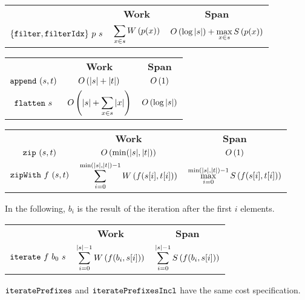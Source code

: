 \begin{costspec}[Filter]

\begin{tabular}{c|c|c}
& \textbf{Work} & \textbf{Span} \\
%
$\{\texttt{filter},\texttt{filterIdx}\}~p~s$ &
$\displaystyle \sum_{x \in s} W\left({p(x)}\right)$ &
$\displaystyle O\left({\log{|s|}}\right) + \max_{x \in s} S\left({p(x)}\right)$ \\
%
\end{tabular}
\end{costspec}

\begin{costspec}[Concatenation]

\begin{tabular}{c|c|c}
& \textbf{Work} & \textbf{Span} \\
%
$\texttt{append}~(s,t)$ &
$\displaystyle O\left({|s| + |t|}\right)$ &
$\displaystyle O\left({1}\right)$ \\
%
$\texttt{flatten}~s$ &
$\displaystyle O\left({|s| + \sum_{x \in s} |x|}\right)$ &
$\displaystyle O\left({\log{|s|}}\right)$
%
\end{tabular}
\end{costspec}

\begin{costspec}[Zip]

\begin{tabular}{c|c|c}
& \textbf{Work} & \textbf{Span} \\
%
$\texttt{zip}~(s,t)$ &
$\displaystyle O\left({\min(|s|,|t|)}\right)$ &
$\displaystyle O\left({1}\right)$ \\
%
$\texttt{zipWith}~f~(s,t)$ &
$\displaystyle \sum_{i = 0}^{\min(|s|,|t|)-1} W\left({f(s[i],t[i])}\right)$ &
$\displaystyle \max_{i = 0}^{\min(|s|,|t|)-1} S\left({f(s[i],t[i])}\right)$
%
\end{tabular}
\end{costspec}

\begin{flex}
\begin{costspec}[Iteration]
In the following, $b_i$ is the result of the iteration after the first $i$
elements.
\begin{tabular}{c|c|c}
& \textbf{Work} & \textbf{Span} \\
%
$\texttt{iterate}~f~b_0~s$ &
$\displaystyle \sum_{i = 0}^{|s|-1} W\left({f(b_i, s[i])}\right)$ &
$\displaystyle \sum_{i = 0}^{|s|-1} S\left({f(b_i, s[i])}\right)$
\end{tabular}
\end{costspec}
\begin{note}
$\texttt{iteratePrefixes}$ and $\texttt{iteratePrefixesIncl}$ have the same cost
specification.
\end{note}
\end{flex}

